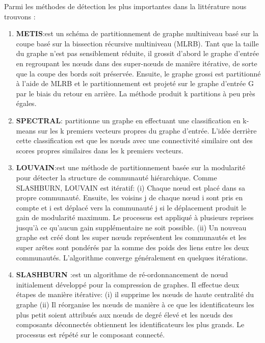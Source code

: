			Parmi les méthodes de détection les plus importantes dans la littérature nous trouvons :
			\begin{enumerate}
				\item \textbf{METIS\citep{karypis2000multilevel}}:est un schéma de partitionnement de graphe multiniveau basé sur la coupe basé sur la bissection récursive multiniveau (MLRB). Tant que la taille du graphe n'est pas sensiblement réduite, il grossit d'abord le graphe d'entrée en regroupant les nœuds dans des super-nœuds de manière itérative, de sorte que la coupe des bords soit préservée. Ensuite, le graphe grossi est partitionné à l'aide de MLRB et le partitionnement est projeté sur le graphe d'entrée G par le biais du retour en arrière. La méthode produit k partitions à peu près égales.
				\item \textbf{SPECTRAL\citep{hespanha2004efficient}}: partitionne un graphe en effectuant une classification en k-means sur les k premiers vecteurs propres du graphe d'entrée. L'idée derrière cette classification est que les nœuds avec une connectivité similaire ont des scores propres similaires dans les k premiers vecteurs.
				\item \textbf{LOUVAIN\citep{blondel2008fast}}:est une méthode de partitionnement basée sur la modularité pour détecter la structure de communauté hiérarchique. Comme SLASHBURN, LOUVAIN est itératif: (i) Chaque nœud est placé dans sa propre communauté. Ensuite, les voisins j de chaque nœud i sont pris en compte et i est déplacé vers la communauté j si le déplacement produit le gain de modularité maximum. Le processus est appliqué à plusieurs reprises jusqu'à ce qu'aucun gain supplémentaire ne soit possible. (ii) Un nouveau graphe est créé dont les super nœuds représentent les communautés et les super arêtes sont pondérés par la somme des poids des liens entre les deux communautés. L'algorithme converge généralement en quelques itérations.
				\item \textbf{SLASHBURN \citep{kang2011beyond}}:est un algorithme de ré-ordonnancement de nœud initialement développé pour la compression de graphes. Il effectue deux étapes de manière itérative: (i) il supprime les nœuds de haute centralité du graphe (ii) Il réorganise les nœuds de manière à ce que les identificateurs les plus petit soient attribués aux nœuds de degré élevé et les nœuds des composants déconnectés obtiennent les identificateurs les plus grands. Le processus est répété sur le composant connecté.

\end{enumerate}

